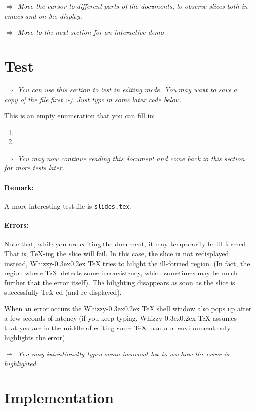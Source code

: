 \documentclass{article}
\let \lst \verb
\def \whizzy{{Whizzy\kern -0.3ex\raise 0.2ex \hbox{\TeX}}}
\def \instruction #1{\par\medskip \noindent$\Rightarrow$ {\em #1}}
\begin{document}
\instruction 
{Move the cursor to different parts of the documents, to observe 
slices both in emacs and on the display. }

\instruction {Move to the next section for an interactive demo}


\section {Test}

\instruction
{You can use this section to test in editing mode.
You may want to save a copy of the file first :-). 
Just type in some latex code below.}

This is an empty enumeration that you can fill in: 
\begin {enumerate}
\item
\item
\end {enumerate}

\instruction
{You may now continue reading this document and come back to this
section for more tests later.}

\paragraph{Remark:}
A more interesting test file is \lst"slides.tex".

\paragraph{Errors:}
Note that, while you are editing the document, it may temporarily be
ill-formed. That is, \TeX-ing the slice will fail. In this case, the slice in
not redisplayed; instead, {\whizzy} tries to hilight the ill-formed region.
(In fact, the region where \TeX\ detects some inconsistency, which sometimes
may be much further that the error itself). The hilighting disappears as
soon as the slice is successfully \TeX-ed (and re-displayed). 

When an error occurs the {\whizzy} shell window also pops up after a few
seconds of latency (if you keep typing, {\whizzy} assumes that you are in the
middle of editing some {\TeX} macro or environment only highlights the
error). 

\instruction
{You may intentionally typed some incorrect tex to see how the error is
highlighted.}


\section {Implementation}
\end{document}
